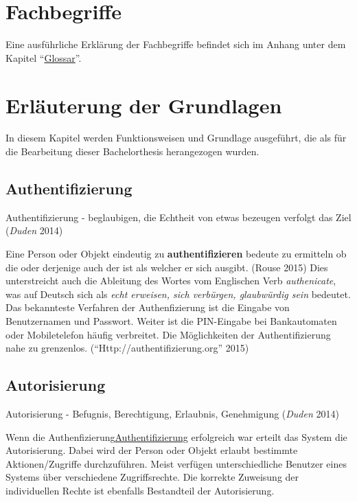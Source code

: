 \section{Fachbegriffe}\label{fachbegriffe}

Eine ausführliche Erklärung der Fachbegriffe befindet sich im Anhang
unter dem Kapitel ``\protect\hyperlink{glossar}{Glossar}''.

\section{Erläuterung der
Grundlagen}\label{erluxe4uterung-der-grundlagen}

In diesem Kapitel werden Funktionsweisen und Grundlage ausgeführt, die
als für die Bearbeitung dieser Bachelorthesis herangezogen wurden.

\subsection{Authentifizierung}\label{authentifizierung}

Authentifizierung - beglaubigen, die Echtheit von etwas bezeugen
verfolgt das Ziel (\emph{Duden} 2014)

Eine Person oder Objekt eindeutig zu \textbf{authentifizieren} bedeute
zu ermitteln ob die oder derjenige auch der ist als welcher er sich
ausgibt. (Rouse 2015) Dies unterstreicht auch die Ableitung des Wortes
vom Englischen Verb \emph{authenicate}, was auf Deutsch sich als
\emph{echt erweisen, sich verbürgen, glaubwürdig sein} bedeutet. Das
bekannteste Verfahren der Authenfizierung ist die Eingabe von
Benutzernamen und Passwort. Weiter ist die PIN-Eingabe bei Bankautomaten
oder Mobiletelefon häufig verbreitet. Die Möglichkeiten der
Authentifizierung nahe zu grenzenlos. (``Http://authentifizierung.org''
2015)

\subsection{Autorisierung}\label{autorisierung}

Autorisierung - Befugnis, Berechtigung, Erlaubnis, Genehmigung
(\emph{Duden} 2014)

Wenn die
Authenfizierung\protect\hyperlink{authentifizierung-1}{Authentifizierung}
erfolgreich war erteilt das System die Autorisierung. Dabei wird der
Person oder Objekt erlaubt bestimmte Aktionen/Zugriffe durchzuführen.
Meist verfügen unterschiedliche Benutzer eines Systems über verschiedene
Zugriffsrechte. Die korrekte Zuweisung der individuellen Rechte ist
ebenfalls Bestandteil der Autorisierung.


